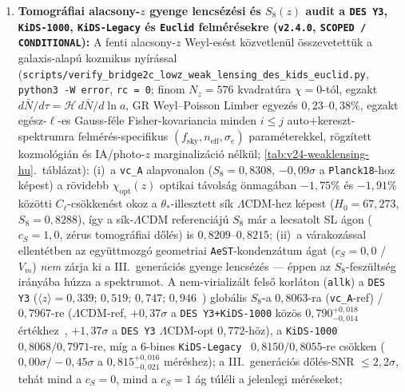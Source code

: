 \documentclass[11pt,a4paper]{article}
\begin{document}
\begin{enumerate}
    (c)~az adversariális monoton lapse-próba ($\bar{N}(a) = 1 - 0{,}015 a^{3/2}$) $\Delta\chi^2_{\mathrm{KK22}} = 0{,}00$ ($c_S = 1{,}0$) és $+1{,}12$ (\texttt{P1}) / $+0{,}65$ (\texttt{2F}) értéket ad $c_S = 0{,}0$-nál ($\Delta\chi^2_{\mathrm{ACT108}} = +0{,}05$, $\Delta\chi^2_{\mathrm{KK13}} = -0{,}02$).
    \item \textbf{Tomográfiai alacsony-$z$ gyenge lencsézési és $S_8(z)$ audit a \texttt{DES Y3}, \texttt{KiDS-1000}, \texttt{KiDS-Legacy} és \texttt{Euclid} felmérésekre (\texttt{v2.4.0}, \texttt{SCOPED / CONDITIONAL}):}
    A fenti alacsony-$z$ Weyl-esést közvetlenül összevetettük a galaxis-alapú kozmikus nyírással (\texttt{scripts/\allowbreak verify\_\allowbreak bridge2c\_\allowbreak lowz\_\allowbreak weak\_\allowbreak lensing\_\allowbreak des\_\allowbreak kids\_\allowbreak euclid.py}, \texttt{python3 -W error}, \texttt{rc = 0}; finom $N_z = 576$ kvadratúra $\chi = 0$-tól, egzakt $d\bar{N}/d\tau = \mathcal{H}\,d\bar{N}/d\ln a$, GR Weyl--Poisson Limber egyezés $0{,}23\text{--}0{,}38\%$, egzakt egész-$\ell$-es Gauss-féle Fisher-kovariancia minden $i \le j$ auto+kereszt-spektrumra felmérés-specifikus $(f_{\mathrm{sky}}, n_{\mathrm{eff}}, \sigma_e)$ paraméterekkel, rögzített kozmológián és IA/photo-$z$ marginalizáció nélkül; \ref{tab:v24-weaklensing-hu}.~táblázat):
    (i)~a \texttt{vc\_A} alapvonalon ($S_8 = 0{,}8308$, $-0{,}09\sigma$ a \texttt{Planck18}-hoz képest) a rövidebb $\chi_{\mathrm{opt}}(z)$ optikai távolság önmagában $-1{,}75\%$ és $-1{,}91\%$ közötti $C_\ell$-csökkenést okoz a $\theta_*$-illesztett sík $\Lambda$CDM-hez képest ($H_0 = 67{,}273$, $S_8 = 0{,}8288$), így a sík-$\Lambda$CDM referenciájú $S_8$ már a lecsatolt SL ágon ($c_S = 1{,}0$, zérus tomográfiai dőlés) is $0{,}8209\text{--}0{,}8215$;
    (ii)~a várakozással ellentétben az együttmozgó geometriai \texttt{AeST}-kondenzátum ágat ($c_S = 0{,}0$ / $V_m$) \emph{nem} zárja ki a III.\ generációs gyenge lencsézés --- éppen az $S_8$-feszültség irányába húzza a spektrumot. A nem-virializált felső korláton (\texttt{allk}) a \texttt{DES Y3} ($\langle z \rangle = 0{,}339;\, 0{,}519;\, 0{,}747;\, 0{,}946$~\cite{Amon2022}) globális $S_8$-a $0{,}8063$-ra (\texttt{vc\_A}-ref) / $0{,}7967$-re ($\Lambda$CDM-ref, $+0{,}37\sigma$ a \texttt{DES Y3+KiDS-1000} közös $0{,}790^{+0{,}018}_{-0{,}014}$ értékhez~\cite{Abbott2023}, $+1{,}37\sigma$ a \texttt{DES Y3} $\Lambda$CDM-opt $0{,}772$-höz), a \texttt{KiDS-1000}~\cite{Asgari2021} $0{,}8068 / 0{,}7971$-re, míg a 6-bines \texttt{KiDS-Legacy}~\cite{Wright2025} $0{,}8150 / 0{,}8055$-re csökken ($0{,}00\sigma / -0{,}45\sigma$ a $0{,}815^{+0{,}016}_{-0{,}021}$ méréshez); a III.\ generációs dőlés-SNR $\le 2{,}2\sigma$, tehát mind a $c_S = 0$, mind a $c_S = 1$ ág túléli a jelenlegi méréseket;

\end{enumerate}
\end{document}
